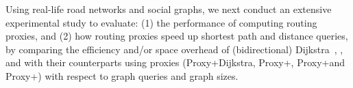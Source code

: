 Using real-life road networks and social graphs, we next conduct an extensive experimental study to evaluate: (1) the performance of computing routing proxies, and (2) how routing proxies speed up shortest  path and distance queries, by comparing the efficiency and/or space overhead of (bidirectional) Dijkstra~\cite{LubyR89}, \arcflag \cite{MohringSSWW05}, \tnr \cite{arz2013transit} and \ah \cite{zhu2013shortest} with their counterparts using proxies (Proxy+Dijkstra, Proxy+\arcflag, Proxy+\tnr and Proxy+\ah) with respect to graph queries and graph sizes.








